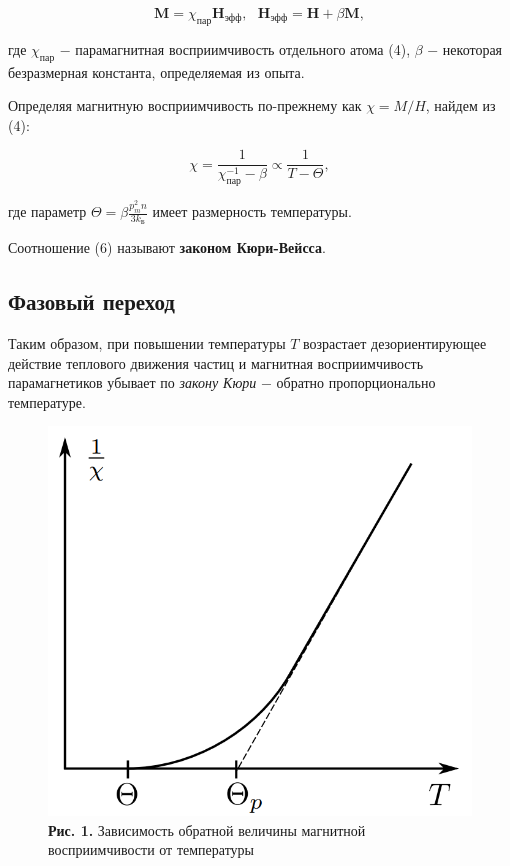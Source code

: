 \documentclass[a4paper,12pt]{article} %
\begin{document}
\begin{equation}\label{ linkname }
\textbf{M} = \chi_\text{пар} \textbf{H}_\text{эфф}, \text{ } \textbf{H}_\text{эфф} = \textbf{H} + \beta \textbf{M},
\end{equation}

\hfill \break где $\chi_\text{пар}$ $-$ парамагнитная восприимчивость отдельного атома (4), $\beta$ $-$ некоторая безразмерная константа, определяемая из опыта.

\hfill \break Определяя магнитную восприимчивость по-прежнему как $\chi = M/H$, найдем из (4):

\begin{equation}\label{ linkname }
\chi = \frac{1}{\chi_\text{пар}^{-1}-\beta} \propto \frac{1}{T-\Theta},
\end{equation}

\hfill \break где параметр $\Theta = \beta \frac{p_{m}^2n}{3k_\text{Б}}$ имеет размерность температуры.

\hfill \break Соотношение (6) называют \textbf{законом Кюри-Вейсса}.

\subsection{Фазовый переход}

\hfill \break Таким образом, при повышении температуры $T$ возрастает дезориентирующее действие теплового движения частиц и магнитная восприимчивость парамагнетиков убывает по \textit{закону Кюри} $-$ обратно пропорционально температуре. 

\begin{figure}
\begin{center}
    \includegraphics[width=1\textwidth]{3.4.2_1.png}
    \textbf{Рис. 1.} Зависимость обратной величины магнитной восприимчивости от температуры
\end{center}
\end{figure}
\end{document}
